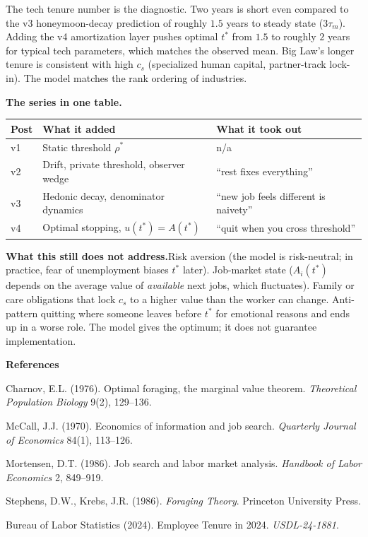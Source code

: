\documentclass[11pt]{article}
\begin{document}
\medskip\noindent The tech tenure number is the diagnostic. Two years is short
even compared to the v3 honeymoon-decay prediction of roughly $1.5$ years to
steady state ($3\tau_m$). Adding the v4 amortization layer pushes optimal
$t^*$ from $1.5$ to roughly $2$ years for typical tech parameters, which
matches the observed mean. Big Law's longer tenure is consistent with high
$c_s$ (specialized human capital, partner-track lock-in). The model matches
the rank ordering of industries.

\medskip\noindent\textbf{The series in one table.}

\begin{tabular}{lll}
\toprule
Post & What it added & What it took out \\
\midrule
v1 & Static threshold $\rho^*$            & n/a \\
v2 & Drift, private threshold, observer wedge & ``rest fixes everything'' \\
v3 & Hedonic decay, denominator dynamics  & ``new job feels different is naivety'' \\
v4 & Optimal stopping, $u(t^*) = A(t^*)$  & ``quit when you cross threshold'' \\
\bottomrule
\end{tabular}

\medskip\noindent\textbf{What this still does not address.}\quad Risk
aversion (the model is risk-neutral; in practice, fear of unemployment biases
$t^*$ later). Job-market state ($A_i(t^*)$ depends on the average value of
\textit{available} next jobs, which fluctuates). Family or care obligations
that lock $c_s$ to a higher value than the worker can change. Anti-pattern
quitting where someone leaves before $t^*$ for emotional reasons and ends up
in a worse role. The model gives the optimum; it does not guarantee
implementation.

\vspace{0.5cm}
\noindent\textbf{References}

\noindent[1] Charnov, E.L. (1976). Optimal foraging, the marginal value theorem. \textit{Theoretical Population Biology} 9(2), 129--136.

\noindent[2] McCall, J.J. (1970). Economics of information and job search. \textit{Quarterly Journal of Economics} 84(1), 113--126.

\noindent[3] Mortensen, D.T. (1986). Job search and labor market analysis. \textit{Handbook of Labor Economics} 2, 849--919.

\noindent[4] Stephens, D.W., Krebs, J.R. (1986). \textit{Foraging Theory}. Princeton University Press.

\noindent[5] Bureau of Labor Statistics (2024). Employee Tenure in 2024. \textit{USDL-24-1881}.
\end{document}
